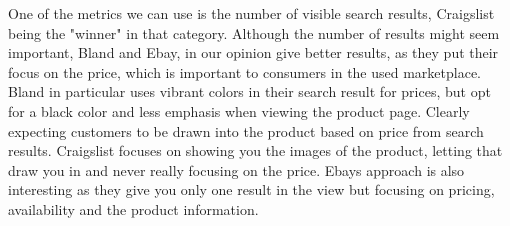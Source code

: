 One of the metrics we can use is the number of visible search results, Craigslist being the "winner" in that category. Although the number of results might seem important, Bland and Ebay, in our opinion give better results, as they put their focus on the price, which is important to consumers in the used marketplace.\\

Bland in particular uses vibrant colors in their search result for prices, but opt for a black color and less emphasis when viewing the product page. Clearly expecting customers to be drawn into the product based on price from search results. Craigslist focuses on showing you the images of the product, letting that draw you in and never really focusing on the price. Ebays approach is also interesting as they give you only one result in the view but focusing on pricing, availability and the product information. 